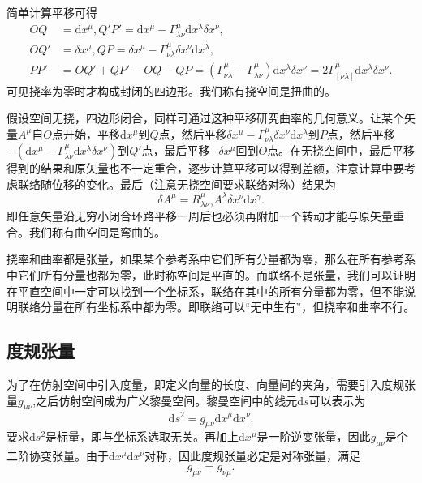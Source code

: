 \documentclass[11pt, a4paper, oneside, onecolumn]{ctexart}
\numberwithin{equation}{subsection}
\begin{document}
简单计算平移可得
\begin{align}
OQ&=\mathrm{d}x^{\mu},Q'P'=\mathrm{d}x^{\mu}-\Gamma_{\lambda\nu}^{\mu}\mathrm{d}x^{\lambda}\delta{}x^{\nu},\\
OQ'&=\delta{}x^{\mu},QP=\delta{}x^{\mu}-\Gamma_{\nu\lambda}^{\mu}\delta{}x^{\nu}\mathrm{d}x^{\lambda},\\
PP'&=OQ'+QP'-OQ-QP=\left(\Gamma_{\nu\lambda}^{\mu}-\Gamma_{\lambda\nu}^{\mu}\right)\mathrm{d}x^{\lambda}\delta{}x^{\nu}=2\Gamma^{\mu}_{\left[\nu\lambda\right]}\mathrm{d}x^{\lambda}\delta{}x^{\nu}.
\end{align}
可见挠率为零时才构成封闭的四边形。我们称有挠空间是扭曲的。

假设空间无挠，四边形闭合，同样可通过这种平移研究曲率的几何意义。让某个矢量$A^{\mu}$自$O$点开始，平移$\mathrm{d}x^{\mu}$到$Q$点，然后平移$\delta{}x^{\mu}-\Gamma_{\nu\lambda}^{\mu}\delta{}x^{\nu}\mathrm{d}x^{\lambda}$到$P$点，然后平移$-\left(\mathrm{d}x^{\mu}-\Gamma_{\lambda\nu}^{\mu}\mathrm{d}x^{\lambda}\delta{}x^{\nu}\right)$到$Q'$点，最后平移$-\delta{}x^{\mu}$回到$O$点。在无挠空间中，最后平移得到的结果和原矢量也不一定重合，逐步计算平移可以得到差额，注意计算中要考虑联络随位移的变化。最后（注意无挠空间要求联络对称）结果为
\begin{equation}
\delta{}A^{\mu}=R^{\mu}_{\lambda\nu\gamma}A^{\lambda}\delta{}x^{\nu}\mathrm{d}x^{\gamma}.
\end{equation}
即任意矢量沿无穷小闭合环路平移一周后也必须再附加一个转动才能与原矢量重合。我们称有曲空间是弯曲的。

挠率和曲率都是张量，如果某个参考系中它们所有分量都为零，那么在所有参考系中它们所有分量也都为零，此时称空间是平直的。而联络不是张量，我们可以证明在平直空间中一定可以找到一个坐标系，联络在其中的所有分量都为零，但不能说明联络分量在所有坐标系中都为零。即联络可以“无中生有”，但挠率和曲率不行。

\subsection{度规张量}
为了在仿射空间中引入度量，即定义向量的长度、向量间的夹角，需要引入度规张量$g_{\mu\nu}$,之后仿射空间成为广义黎曼空间。黎曼空间中的线元$\mathrm{d}s$可以表示为
\begin{equation}
\mathrm{d}s^{2}=g_{\mu\nu}\mathrm{d}x^{\mu}\mathrm{d}x^{\nu}.
\end{equation}
要求$\mathrm{d}s^{2}$是标量，即与坐标系选取无关。再加上$\mathrm{d}x^{\mu}$是一阶逆变张量，因此$g_{\mu\nu}$是个二阶协变张量。由于$\mathrm{d}x^{\mu}\mathrm{d}x^{\nu}$对称，因此度规张量必定是对称张量，满足
\begin{equation}
g_{\mu\nu}=g_{\nu\mu}.
\end{equation}
\end{document}
